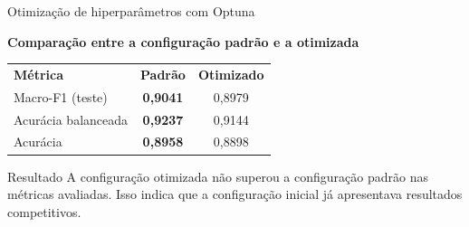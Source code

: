\begin{frame}{Otimização de hiperparâmetros com Optuna}
	
	\centering
	\small
	\textbf{Comparação entre a configuração padrão e a otimizada}
	
	\vspace{0.35cm}
	
	\begin{tabular}{lcc}
		\rowcolor{UELGreen}
		\color{white}\textbf{Métrica} &
		\color{white}\textbf{Padrão} &
		\color{white}\textbf{Otimizado} \\
		
		Macro-F1 (teste) &
		\textcolor{UELGreen}{\textbf{0,9041}} &
		0,8979 \\
		
		Acurácia balanceada &
		\textcolor{UELGreen}{\textbf{0,9237}} &
		0,9144 \\
		
		Acurácia &
		\textcolor{UELGreen}{\textbf{0,8958}} &
		0,8898 \\
		
	\end{tabular}
	
	\vspace{0.5cm}
	
	\begin{block}{Resultado}
		A configuração otimizada não superou a configuração
		padrão nas métricas avaliadas. Isso indica que a
		configuração inicial já apresentava resultados competitivos.
	\end{block}
	
\end{frame}
